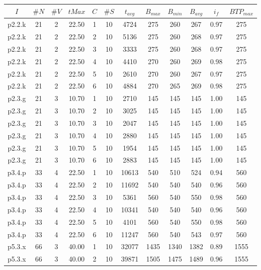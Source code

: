 \begin{center}
\begin{tabular}{ |c|c|c|c|c|c|c|c|c|c|c|c| } 
\hline
$I$ & $\#N$ & $\#V$ & $tMax$ & $C$ & $\#S$ & $t_{avg}$ & $B_{max}$ & $B_{min}$ & $B_{avg}$ & $i_{f}$ & $BTP_{max}$ \\
\hline
p2.2.k & 21 & 2 & 22.50 & 1 & 10 & 4724 & 275 & 260 & 267 & 0.97 & 275  \\
p2.2.k & 21 & 2 & 22.50 & 2 & 10 & 5136 & 275 & 260 & 268 & 0.97 & 275  \\
p2.2.k & 21 & 2 & 22.50 & 3 & 10 & 3333 & 275 & 260 & 268 & 0.97 & 275  \\
p2.2.k & 21 & 2 & 22.50 & 4 & 10 & 4410 & 270 & 260 & 269 & 0.98 & 275  \\
p2.2.k & 21 & 2 & 22.50 & 5 & 10 & 2610 & 270 & 260 & 267 & 0.97 & 275  \\
p2.2.k & 21 & 2 & 22.50 & 6 & 10 & 4884 & 270 & 265 & 269 & 0.98 & 275  \\
p2.3.g & 21 & 3 & 10.70 & 1 & 10 & 2710 & 145 & 145 & 145 & 1.00 & 145  \\
p2.3.g & 21 & 3 & 10.70 & 2 & 10 & 3025 & 145 & 145 & 145 & 1.00 & 145  \\
p2.3.g & 21 & 3 & 10.70 & 3 & 10 & 2047 & 145 & 145 & 145 & 1.00 & 145  \\
p2.3.g & 21 & 3 & 10.70 & 4 & 10 & 2880 & 145 & 145 & 145 & 1.00 & 145  \\
p2.3.g & 21 & 3 & 10.70 & 5 & 10 & 1954 & 145 & 145 & 145 & 1.00 & 145  \\
p2.3.g & 21 & 3 & 10.70 & 6 & 10 & 2883 & 145 & 145 & 145 & 1.00 & 145  \\
p3.4.p & 33 & 4 & 22.50 & 1 & 10 & 10613 & 540 & 510 & 524 & 0.94 & 560  \\
p3.4.p & 33 & 4 & 22.50 & 2 & 10 & 11692 & 540 & 540 & 540 & 0.96 & 560  \\
p3.4.p & 33 & 4 & 22.50 & 3 & 10 & 5361 & 560 & 540 & 550 & 0.98 & 560  \\
p3.4.p & 33 & 4 & 22.50 & 4 & 10 & 10341 & 540 & 540 & 540 & 0.96 & 560  \\
p3.4.p & 33 & 4 & 22.50 & 5 & 10 & 4101 & 560 & 540 & 550 & 0.98 & 560  \\
p3.4.p & 33 & 4 & 22.50 & 6 & 10 & 11247 & 560 & 540 & 543 & 0.97 & 560  \\
p5.3.x & 66 & 3 & 40.00 & 1 & 10 & 32077 & 1435 & 1340 & 1382 & 0.89 & 1555  \\
p5.3.x & 66 & 3 & 40.00 & 2 & 10 & 39871 & 1505 & 1475 & 1489 & 0.96 & 1555  \\

\end{tabular}
\end{center}
